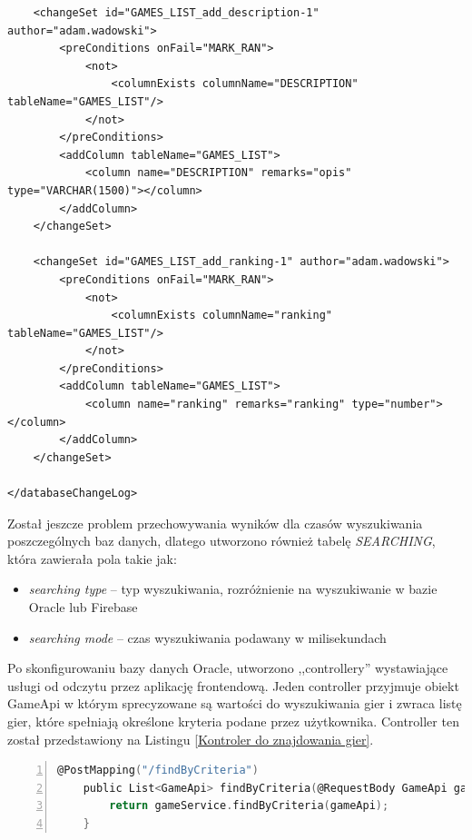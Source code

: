 \begin{lstlisting}
    <changeSet id="GAMES_LIST_add_description-1" author="adam.wadowski">
        <preConditions onFail="MARK_RAN">
            <not>
                <columnExists columnName="DESCRIPTION" tableName="GAMES_LIST"/>
            </not>
        </preConditions>
        <addColumn tableName="GAMES_LIST">
            <column name="DESCRIPTION" remarks="opis" type="VARCHAR(1500)"></column>
        </addColumn>
    </changeSet>

    <changeSet id="GAMES_LIST_add_ranking-1" author="adam.wadowski">
        <preConditions onFail="MARK_RAN">
            <not>
                <columnExists columnName="ranking" tableName="GAMES_LIST"/>
            </not>
        </preConditions>
        <addColumn tableName="GAMES_LIST">
            <column name="ranking" remarks="ranking" type="number"></column>
        </addColumn>
    </changeSet>

</databaseChangeLog>
\end{lstlisting}

Został jeszcze problem przechowywania wyników dla czasów wyszukiwania poszczególnych baz danych, dlatego utworzono również tabelę \textit{SEARCHING}, która zawierała pola takie jak:
\begin{itemize}
\item \textit{searching type} -- typ wyszukiwania, rozróżnienie na wyszukiwanie w bazie Oracle lub Firebase
\item \textit{searching mode} -- czas wyszukiwania podawany w milisekundach
\end{itemize}
Po skonfigurowaniu bazy danych Oracle, utworzono ,,controllery'' wystawiające usługi od odczytu przez aplikację frontendową. Jeden controller przyjmuje obiekt GameApi w którym sprecyzowane są wartości do wyszukiwania gier i zwraca listę gier, które spełniają określone kryteria podane przez użytkownika. Controller ten został przedstawiony na Listingu \ref{Kontroler do znajdowania gier}.
\begin{lstlisting}[language=C, mathescape, frame=single, numbers=left, xleftmargin=2em, framexleftmargin=2em, basicstyle=\ttfamily\bfseries, caption={Kontroler do znajdowania gier}, label={Kontroler do znajdowania gier}]
@PostMapping("/findByCriteria")
    public List<GameApi> findByCriteria(@RequestBody GameApi gameApi) {
        return gameService.findByCriteria(gameApi);
    }
\end{lstlisting}

